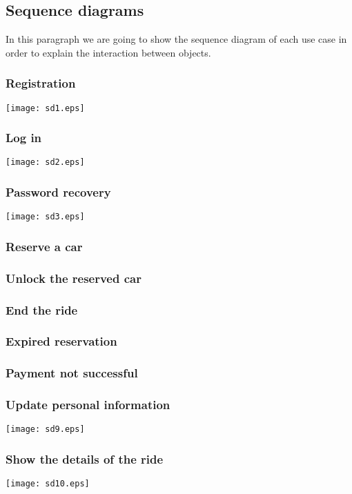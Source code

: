 \pagebreak
\subsection{Sequence diagrams}
In this paragraph we are going to show the sequence diagram of each use case in order to explain the interaction between objects.

\subsubsection{Registration}
	\centerline{
		\texttt{[image: sd1.eps]}}
	\pagebreak

\subsubsection{Log in}
	\centerline{
		\texttt{[image: sd2.eps]}}
	\pagebreak

\subsubsection{Password recovery}
	\centerline{
		\texttt{[image: sd3.eps]}}
	\pagebreak
	
\subsubsection{Reserve a car}
	
\subsubsection{Unlock the reserved car}

\subsubsection{End the ride}

\subsubsection{Expired reservation}
	
\subsubsection{Payment not successful}
	\pagebreak
	
\subsubsection{Update personal information}
	\centerline{
		\texttt{[image: sd9.eps]}}
	\pagebreak
	
\subsubsection{Show the details of the ride}
	\centerline{
		\texttt{[image: sd10.eps]}}